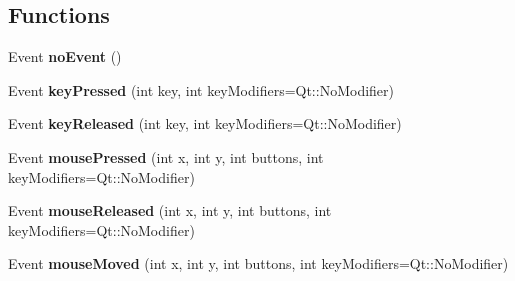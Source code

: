 \subsection*{Functions}
\begin{DoxyCompactItemize}
\item 
\hypertarget{group___event_ga691df2a744335cf4257816068a74c95d}{Event {\bfseries no\-Event} ()}\label{group___event_ga691df2a744335cf4257816068a74c95d}

\item 
\hypertarget{group___event_ga653a56731938006a7441685d3751c5c7}{Event {\bfseries key\-Pressed} (int key, int key\-Modifiers=Qt\-::\-No\-Modifier)}\label{group___event_ga653a56731938006a7441685d3751c5c7}

\item 
\hypertarget{group___event_ga91a2c851964a7afc41c3ae873abcee5d}{Event {\bfseries key\-Released} (int key, int key\-Modifiers=Qt\-::\-No\-Modifier)}\label{group___event_ga91a2c851964a7afc41c3ae873abcee5d}

\item 
\hypertarget{group___event_ga9b9ff63b87aedb4d5141fed7365c911b}{Event {\bfseries mouse\-Pressed} (int x, int y, int buttons, int key\-Modifiers=Qt\-::\-No\-Modifier)}\label{group___event_ga9b9ff63b87aedb4d5141fed7365c911b}

\item 
\hypertarget{group___event_ga506192889c6399011033aa9e8b2e1a49}{Event {\bfseries mouse\-Released} (int x, int y, int buttons, int key\-Modifiers=Qt\-::\-No\-Modifier)}\label{group___event_ga506192889c6399011033aa9e8b2e1a49}

\item 
\hypertarget{group___event_gaafd1ef3bc6a9ecb40de90ca46a8fc852}{Event {\bfseries mouse\-Moved} (int x, int y, int buttons, int key\-Modifiers=Qt\-::\-No\-Modifier)}\label{group___event_gaafd1ef3bc6a9ecb40de90ca46a8fc852}

\end{DoxyCompactItemize}
